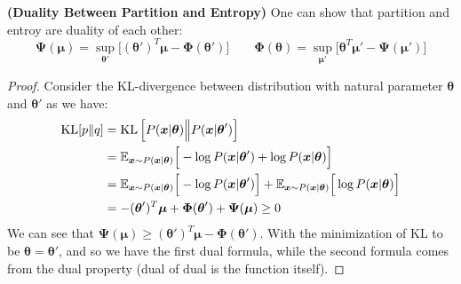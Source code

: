 \begin{proposition}{\textbf{(Duality Between Partition and Entropy)}}
    One can show that partition and entroy are duality of each other:
    \begin{equation*}
        \boldsymbol \Psi(\boldsymbol \mu) = \sup_{\boldsymbol \theta'}\Big[ (\boldsymbol \theta')^T\boldsymbol \mu - \boldsymbol \Phi(\boldsymbol \theta') \Big] \qquad \boldsymbol \Phi(\boldsymbol \theta) = \sup_{\boldsymbol \mu'}\Big[\boldsymbol \theta^T\boldsymbol \mu' - \boldsymbol \Psi(\boldsymbol \mu')\Big]
    \end{equation*}
\end{proposition}
\begin{proof}
    Consider the KL-divergence between distribution with natural parameter $\boldsymbol \theta$ and $\boldsymbol \theta'$ as we have:
    \begin{equation*}
    \begin{aligned}
        \operatorname{KL}[p \| q] &= \operatorname{KL}\left[ P(\boldsymbol x|\boldsymbol \theta) \Big\| P(\boldsymbol x | \boldsymbol \theta')  \right] \\
        &= \mathbb{E}_{\boldsymbol x \sim P(\boldsymbol x | \boldsymbol \theta)}\Big[ -\log P(\boldsymbol x | \boldsymbol \theta') + \log P(\boldsymbol x | \boldsymbol \theta) \Big] \\
        &= \mathbb{E}_{\boldsymbol x \sim P(\boldsymbol x | \boldsymbol \theta)}\Big[ -\log P(\boldsymbol x | \boldsymbol \theta') \Big]+ \mathbb{E}_{\boldsymbol x \sim P(\boldsymbol x | \boldsymbol \theta)}\Big[\log P(\boldsymbol x | \boldsymbol \theta) \Big] \\
        &= -(\boldsymbol \theta')^T\boldsymbol \mu + \boldsymbol \Phi(\boldsymbol \theta') + \boldsymbol \Psi(\boldsymbol \mu)\ge0
    \end{aligned}
    \end{equation*}
    We can see that $\boldsymbol \Psi(\boldsymbol \mu)\ge (\boldsymbol \theta')^T\boldsymbol \mu - \boldsymbol \Phi(\boldsymbol \theta')$. With the minimization of KL to be $\boldsymbol \theta = \boldsymbol \theta'$, and so we have the first dual formula, while the second formula comes from the dual property (dual of dual is the function itself). 
\end{proof}

